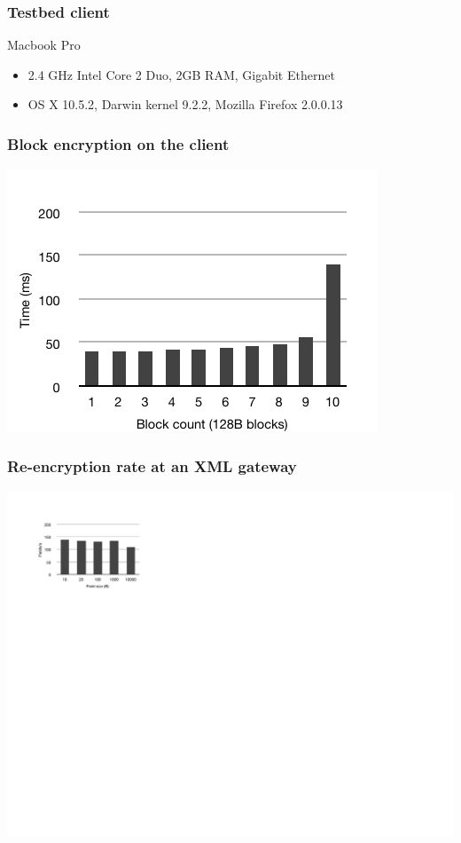 \documentclass{beamer}
\begin{document}
\begin{frame}
\frametitle{Testbed client}
Macbook Pro
\begin{itemize}
\item 2.4 GHz Intel Core 2 Duo, 2GB RAM, Gigabit Ethernet
\item OS X 10.5.2, Darwin kernel 9.2.2, Mozilla Firefox 2.0.0.13
\end{itemize}
\end{frame}

\begin{frame}
\frametitle{Block encryption on the client}
\begin{center}
\includegraphics{client_field_count_new} \\
\end{center}
\end{frame}

\begin{frame}
\frametitle{Re-encryption rate at an XML gateway}
\begin{center}
\includegraphics{server_encrypt} \\
\end{center}
\end{frame}
\end{document}

